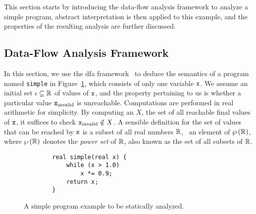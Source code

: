 This section starts by introducing the data-flow analysis framework to analyze
a simple program, abstract interpretation is then applied to this example, and
the properties of the resulting analysis are further discussed.


\subsection{Data-Flow Analysis Framework}
\label{bg:sub:data_flow}

In this section, we use the \gls{dfa} framework~\cite{nielson99} to deduce
the semantics of a program named \verb|simple| in Figure~\ref{bg:lst:simple},
which consists of only one variable $\texttt{x}$.  We assume an initial set $\iota
\subseteq \mathbb{R}$ of values of $\texttt{x}$, and the property pertaining to
us is whether a particular value $\texttt{x}_\mathrm{invalid}$ is unreachable.
Computations are performed in real arithmetic for simplicity.  By computing an
$X$, the set of all reachable final values of $\texttt{x}$, it suffices to check
$\texttt{x}_\mathrm{invalid} \notin X$.  A sensible definition for the set of values
that can be reached by $\texttt{x}$ is a subset of all real numbers $\mathbb{R}$,
\ie~an element of $\wp\left({\mathbb{R}}\right)$, where $\wp\left({\mathbb{R}}\right)$ denotes
the \emph{power set} of $\mathbb{R}$, also known as the set of all subsets of
$\mathbb{R}$.
\begin{figure}[ht]
    \begin{lstlisting}
        real simple(real x) {
            while (x > 1.0)
                x *= 0.9;
            return x;
        }
    \end{lstlisting}
    \caption{%
        A simple program example to be statically analyzed.
    }\label{bg:lst:simple}
\end{figure}

